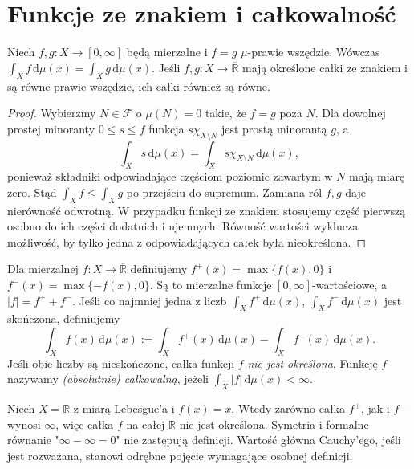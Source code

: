 \section{Funkcje ze znakiem i całkowalność}

\begin{twierdzenie}
\label{thm:ae-integral-invariance}
Niech $f,g:X\to[0,\infty]$ będą mierzalne i
$f=g$ $\mu$-prawie wszędzie. Wówczas
$\int_Xf\,\mathrm d\mu(x)=\int_Xg\,\mathrm d\mu(x)$.
Jeśli $f,g:X\to\overline{\mathbb R}$ mają określone
całki ze znakiem i są równe prawie wszędzie, ich
całki również są równe.
\end{twierdzenie}
\begin{proof}
Wybierzmy $N\in\mathcal F$ o $\mu(N)=0$ takie,
że $f=g$ poza $N$. Dla dowolnej prostej minoranty
$0\le s\le f$ funkcja $s\chi_{X\setminus N}$
jest prostą minorantą $g$, a
\[
\int_Xs\,\mathrm d\mu(x)
=\int_Xs\chi_{X\setminus N}\,\mathrm d\mu(x),
\]
ponieważ składniki odpowiadające częściom poziomic
zawartym w $N$ mają miarę zero. Stąd
$\int_X f\le\int_X g$ po przejściu do supremum.
Zamiana ról $f,g$ daje nierówność odwrotną.
W przypadku funkcji ze znakiem stosujemy część
pierwszą osobno do ich części dodatnich i ujemnych.
Równość wartości wyklucza możliwość, by tylko jedna
z odpowiadających całek była nieokreślona.
\end{proof}

\begin{definicja}
\label{def:positive-negative-parts}
Dla mierzalnej $f:X\to\overline{\mathbb R}$ definiujemy
$f^+(x)=\max\{f(x),0\}$ i
$f^-(x)=\max\{-f(x),0\}$. Są to mierzalne funkcje
$[0,\infty]$-wartościowe, a $|f|=f^++f^-$.
Jeśli co najmniej jedna z liczb
$\int_Xf^+\,\mathrm d\mu(x)$,
$\int_Xf^-\,\mathrm d\mu(x)$ jest skończona, definiujemy
\begin{equation}\label{eq:signed-integral}
\int_X f(x)\,\mathrm d\mu(x)
:=\int_Xf^+(x)\,\mathrm d\mu(x)
-\int_Xf^-(x)\,\mathrm d\mu(x).
\end{equation}
Jeśli obie liczby są nieskończone, całka funkcji $f$
\emph{nie jest określona}. Funkcję $f$ nazywamy
\emph{(absolutnie) całkowalną}, jeżeli
$\int_X|f|\,\mathrm d\mu(x)<\infty$.
\end{definicja}

\begin{uwaga}
Niech $X=\mathbb R$ z miarą Lebesgue'a i
$f(x)=x$. Wtedy zarówno całka $f^+$, jak i $f^-$
wynosi $\infty$, więc całka $f$ na całej $\mathbb R$
nie jest określona. Symetria i formalne równanie
"$\infty-\infty=0$" nie zastępują definicji.
Wartość główna Cauchy'ego, jeśli jest rozważana,
stanowi odrębne pojęcie wymagające osobnej definicji.
\end{uwaga}

